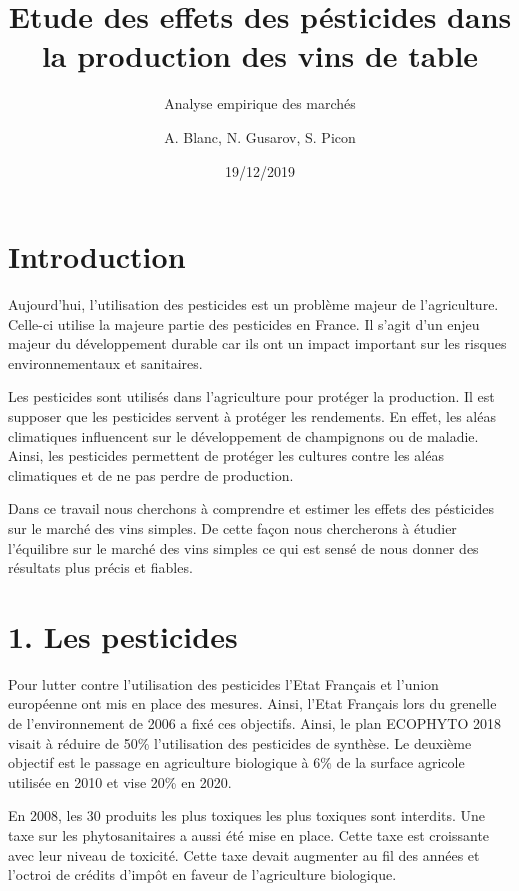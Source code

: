 \documentclass[11pt,]{article}
\title{Etude des effets des pésticides dans la production des vins de table}
\subtitle{Analyse empirique des marchés}
\author{A. Blanc, N. Gusarov, S. Picon}
\date{19/12/2019}
\begin{document}
\maketitle

\hypertarget{introduction}{%
\section{Introduction}\label{introduction}}

Aujourd'hui, l'utilisation des pesticides est un problème majeur de
l'agriculture.\\
Celle-ci utilise la majeure partie des pesticides en France. Il s'agit
d'un enjeu majeur du développement durable car ils ont un impact
important sur les risques environnementaux et sanitaires.

Les pesticides sont utilisés dans l'agriculture pour protéger la
production. Il est supposer que les pesticides servent à protéger les
rendements. En effet, les aléas climatiques influencent sur le
développement de champignons ou de maladie. Ainsi, les pesticides
permettent de protéger les cultures contre les aléas climatiques et de
ne pas perdre de production.

Dans ce travail nous cherchons à comprendre et estimer les effets des
pésticides sur le marché des vins simples. De cette façon nous
chercherons à étudier l'équilibre sur le marché des vins simples ce qui
est sensé de nous donner des résultats plus précis et fiables.

\hypertarget{les-pesticides}{%
\section{1. Les pesticides}\label{les-pesticides}}

Pour lutter contre l'utilisation des pesticides l'Etat Français et
l'union européenne ont mis en place des mesures. Ainsi, l'Etat Français
lors du grenelle de l'environnement de 2006 a fixé ces objectifs. Ainsi,
le plan ECOPHYTO 2018 visait à réduire de 50\% l'utilisation des
pesticides de synthèse. Le deuxième objectif est le passage en
agriculture biologique à 6\% de la surface agricole utilisée en 2010 et
vise 20\% en 2020.

En 2008, les 30 produits les plus toxiques les plus toxiques sont
interdits. Une taxe sur les phytosanitaires a aussi été mise en place.
Cette taxe est croissante avec leur niveau de toxicité. Cette taxe
devait augmenter au fil des années et l'octroi de crédits d'impôt en
faveur de l'agriculture biologique.
\end{document}
